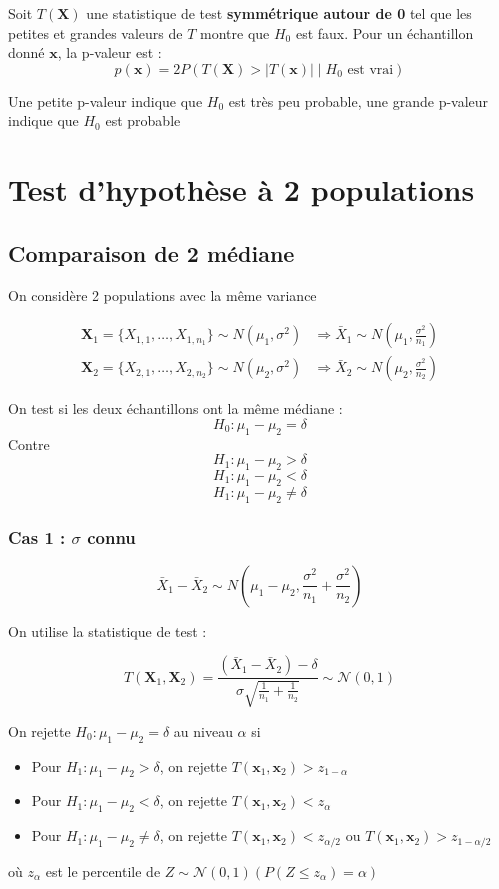 \documentclass[12pt,a4paper]{article}
\begin{document}
Soit $T(\mathbf{X})$ une statistique de test \textbf{symmétrique autour de 0} tel que les petites et grandes valeurs de $T$ montre que $H_0$ est faux. Pour un échantillon donné $\mathbf{x}$, la p-valeur est :
$$ p(\mathbf{x}) = 2P(T(\mathbf{X}) > |T(\mathbf{x})| \mid H_0 \text{ est vrai}) $$

Une petite p-valeur indique que $H_0$ est très peu probable, une grande p-valeur indique que $H_0$ est probable
 

\section{Test d'hypothèse à 2 populations}

\subsection{Comparaison de 2 médiane}

On considère 2 populations avec la même variance

\begin{align*}
\mathbf{X}_1 = \{X_{1,1}, \dots, X_{1,n_1}\} \sim N(\mu_1, \sigma^2) &\Rightarrow \bar{X}_1 \sim N\left(\mu_1, \frac{\sigma^2}{n_1}\right) \\
\mathbf{X}_2 = \{X_{2,1}, \dots, X_{2,n_2}\} \sim N(\mu_2, \sigma^2) &\Rightarrow \bar{X}_2 \sim N\left(\mu_2, \frac{\sigma^2}{n_2}\right)
\end{align*}

On test si les deux échantillons ont la même médiane :
$$H_0 : \mu_1 - \mu_2 = \delta$$
Contre
$$H_1 : \mu_1 - \mu_2 > \delta$$
$$H_1 : \mu_1 - \mu_2 < \delta$$
$$H_1 : \mu_1 - \mu_2 \neq \delta$$

\subsubsection{Cas 1 : $\sigma$ connu}

$$\bar{X}_1 - \bar{X}_2 \sim N \left( \mu_1 - \mu_2, \frac{\sigma^2}{n_1} + \frac{\sigma^2}{n_2} \right)$$

On utilise la statistique de test :

$$
T(\mathbf{X}_1, \mathbf{X}_2) = \frac{(\bar{X}_1 - \bar{X}_2) - \delta}{\sigma \sqrt{\frac{1}{n_1} + \frac{1}{n_2}}} \sim \mathcal{N}(0,1)
$$

On rejette $H_0 : \mu_1 - \mu_2 = \delta$ au niveau $\alpha$ si
\begin{itemize}
    \item Pour $H_1 : \mu_1 - \mu_2 > \delta$, on rejette $T(\mathbf{x}_1,\mathbf{x}_2) > z_{1-\alpha}$
    \item Pour $H_1 : \mu_1 - \mu_2 < \delta$, on rejette $T(\mathbf{x}_1,\mathbf{x}_2) < z_{\alpha}$
    \item Pour $H_1 : \mu_1 - \mu_2 \neq \delta$, on rejette $T(\mathbf{x}_1,\mathbf{x}_2) < z_{\alpha/2}$ ou $T(\mathbf{x}_1,\mathbf{x}_2) > z_{1-\alpha/2}$
\end{itemize}
où $z_\alpha$ est le percentile de $Z \sim \mathcal{N}(0,1) (P(Z \leq z_\alpha) = \alpha)$
\end{document}
